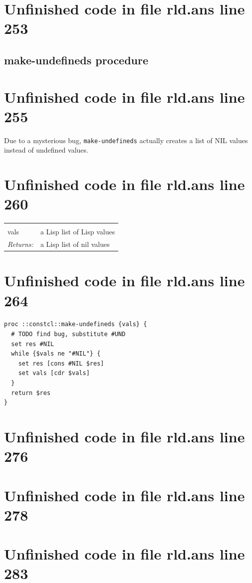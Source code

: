 \documentclass[twoside,9pt]{report}
\begin{document}
\section{Unfinished code in file rld.ans line 253}
\subsection{make-undefineds procedure}
\label{make-undefineds-procedure}
\section{Unfinished code in file rld.ans line 255}


Due to a mysterious bug, \texttt{make-undefineds} actually creates a list of NIL values instead of undefined values.

\section{Unfinished code in file rld.ans line 260}
\noindent\begin{tabular}{ |p{1.9cm} p{8cm}| }
\hline
\rowcolor[HTML]{CCCCCC} \multicolumn{2}{|l|}{\bf make-undefineds (internal)} \\
vals & a Lisp list of Lisp values \\
\textit{Returns:} & a Lisp list of nil values \\
\hline
\end{tabular}
\section{Unfinished code in file rld.ans line 264}
\begin{lstlisting}
proc ::constcl::make-undefineds {vals} {
  # TODO find bug, substitute #UND
  set res #NIL
  while {$vals ne "#NIL"} {
    set res [cons #NIL $res]
    set vals [cdr $vals]
  }
  return $res
}
\end{lstlisting}
\section{Unfinished code in file rld.ans line 276}
\section{Unfinished code in file rld.ans line 278}
\section{Unfinished code in file rld.ans line 283}
\end{document}
